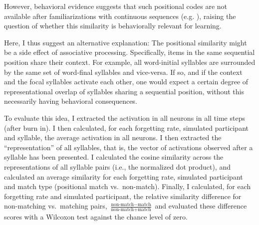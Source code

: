 \documentclass[
]{article}
\begin{document}
However, behavioral evidence suggests that such positional codes are not
available after familiarizations with continuous sequences (e.g.
\citep{Marchetto2013, Endress-AXC, Endress-AXC-Edge, Endress-AXC-Review, Pena2002}),
raising the question of whether this similarity is behaviorally relevant
for learning.

Here, I thus suggest an alternative explanation: The positional
similarity might be a side effect of associative processing.
Specifically, items in the same sequential position share their context.
For example, all word-initial syllables are surrounded by the same set
of word-final syllables and vice-versa. If so, and if the context and
the focal syllables activate each other, one would expect a certain
degree of representational overlap of syllables sharing a sequential
position, without this necessarily having behavioral consequences.

To evaluate this idea, I extracted the activation in all neurons in all
time steps (after burn in). I then calculated, for each forgetting rate,
simulated participant and syllable, the average activation in all
neurons. I then extracted the ``representation'' of all syllables, that
is, the vector of activations observed after a syllable has been
presented. I calculated the cosine similarity across the representations
of all syllable pairs (i.e., the normalized dot product), and calculated
an average similarity for each forgetting rate, simulated participant
and match type (positional match vs.~non-match). Finally, I calculated,
for each forgetting rate and simulated participant, the relative
similarity difference for non-matching vs.~matching pairs,
\(\frac{\text{non-match} - \text{match}}{\text{non-match} + \text{match}}\)
and evaluated these difference scores with a Wilcoxon test against the
chance level of zero.
\end{document}
